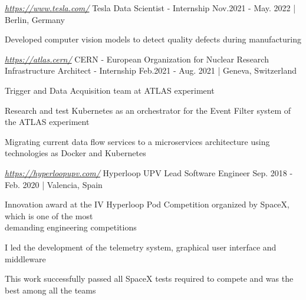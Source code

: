 

\begin{cventries}

  \cventry
    {\href{https://www.tesla.com/}{\textit{https://www.tesla.com/}}} %
    {Tesla} %
    {Data Scientist - Internship} %
    {Nov.2021 - May. 2022 | Berlin,  Germany} %
    {
      \begin{cvitems} %
        \item {Developed computer vision models to detect quality defects during manufacturing}
      \end{cvitems}
    }

  \cventry
    {\href{https://atlas.cern/}{\textit{https://atlas.cern/}}} %
    {CERN - European Organization for Nuclear Research} %
    {Infrastructure Architect - Internship} %
    {Feb.2021 - Aug. 2021 | Geneva,  Switzerland} %
    {
      \begin{cvitems} %
        \item {Trigger and Data Acquisition team at ATLAS experiment}
        \item {Research and test Kubernetes as an orchestrator for the Event Filter system of the ATLAS experiment}
        \item {Migrating current data flow services to a microservices architecture using technologies as Docker and Kubernetes}
      \end{cvitems}
    }

  \cventry
    {\href{https://hyperloopupv.com/}{\textit{https://hyperloopupv.com/}}} %
    {Hyperloop UPV} %
    {Lead Software Engineer} %
    {Sep. 2018 - Feb. 2020 | Valencia, Spain} %
    {
      \begin{cvitems} %
        \item {Innovation award at the IV Hyperloop Pod Competition organized by SpaceX, which is one of the most \\demanding engineering competitions}
        \item {I led the development of the telemetry system, graphical user interface and middleware}
        \item {This work successfully passed all SpaceX tests required to compete and was the best among all the teams}
      \end{cvitems}
    }
    

\end{cventries}
